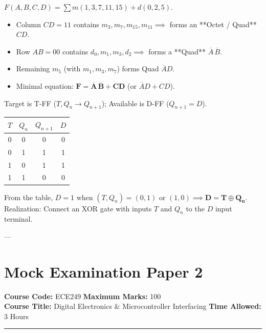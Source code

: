 \begin{solutionbox}
$F(A,B,C,D) = \sum m(1, 3, 7, 11, 15) + d(0, 2, 5)$.
\begin{itemize}
    \item Column $CD=11$ contains $m_3, m_7, m_{15}, m_{11} \implies$ forms an **Octet / Quad** $CD$.
    \item Row $AB=00$ contains $d_0, m_1, m_3, d_2 \implies$ forms a **Quad** $\overline{A}\,\overline{B}$.
    \item Remaining $m_5$ (with $m_1, m_3, m_7$) forms Quad $\overline{A}D$.
    \item Minimal equation: $\mathbf{F = \overline{A}\,\overline{B} + CD}$ (or $\overline{A}D + CD$).
\end{itemize}
\end{solutionbox}

\begin{solutionbox}
Target is T-FF ($T, Q_n \rightarrow Q_{n+1}$); Available is D-FF ($Q_{n+1} = D$).
\begin{center}
\small
\begin{tabular}{cc|c|c}
\toprule
$T$ & $Q_n$ & $Q_{n+1}$ & $D$ \\
\midrule
0 & 0 & 0 & 0 \\
0 & 1 & 1 & 1 \\
1 & 0 & 1 & 1 \\
1 & 1 & 0 & 0 \\
\bottomrule
\end{tabular}
\end{center}
From the table, $D = 1$ when $(T, Q_n) = (0,1)$ or $(1,0) \implies \mathbf{D = T \oplus Q_n}$.
Realization: Connect an XOR gate with inputs $T$ and $Q_n$ to the $D$ input terminal.
\end{solutionbox}

---

\section{Mock Examination Paper 2}
\noindent\textbf{Course Code:} ECE249 \hfill \textbf{Maximum Marks:} 100 \\
\textbf{Course Title:} Digital Electronics \& Microcontroller Interfacing \hfill \textbf{Time Allowed:} 3 Hours

\vspace{0.4cm}
\noindent\rule{\textwidth}{1.2pt}

